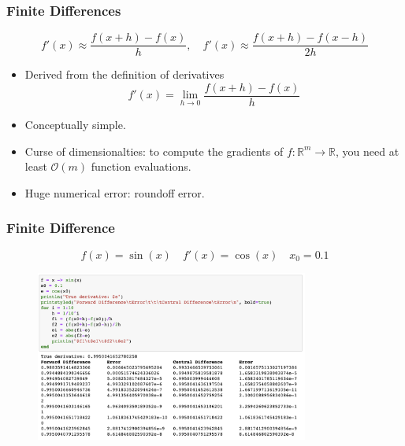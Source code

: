 \documentclass{beamer}
\newcommand{\RR}[0]{\mathbb{R}}
\begin{document}
\begin{frame}
	\frametitle{Finite Differences}


	$$f'(x) \approx \frac{f(x+h) - f(x)}{h},\quad f'(x)\approx \frac{f(x+h) - f(x-h)}{2h}$$
	\begin{itemize}
	\item Derived from the definition of derivatives
	\begin{equation*}
		f'(x) = \lim_{h\rightarrow 0} \frac{f(x+h)-f(x)}{h}
	\end{equation*}
	\item Conceptually simple.
	\item Curse of dimensionalties: to compute the gradients of $f:\RR^m \rightarrow \RR$, you need at least $\mathcal{O}(m)$ function evaluations. 
	\item Huge numerical error: roundoff error. 
	\end{itemize}
		
\end{frame}


\begin{frame}
	\frametitle{Finite Difference}
\begin{equation*}
	f(x) = \sin(x) \quad f'(x) = \cos(x) \quad  x_0 = 0.1
\end{equation*}
	\begin{figure}[hbt]
	\centering
  \includegraphics[width=0.8\textwidth]{figures/roundoff}
\end{figure}

\end{frame}
\end{document}
